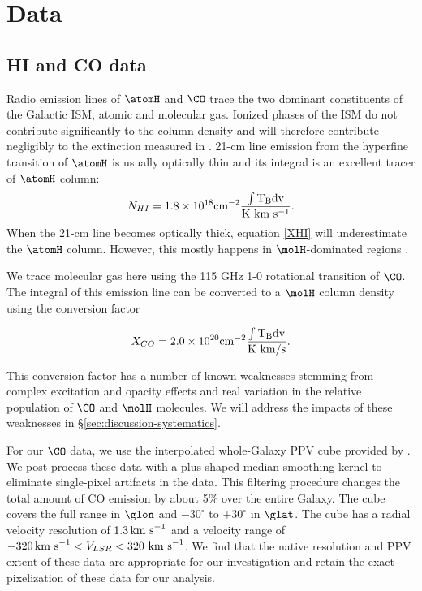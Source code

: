 \section{Data}
\label{sec:data}
\subsection{HI and CO data}

Radio emission lines of $\atomH$ and $\CO$ trace the two dominant constituents of the Galactic ISM, atomic and molecular gas. 
Ionized phases of the ISM do not contribute significantly to the column density and will therefore contribute negligibly to the extinction measured in \citet{Green_2015}. 
21-cm line emission from the hyperfine transition of $\atomH$ is usually optically thin and its integral is an excellent tracer of $\atomH$ column:
\begin{equation}\label{XHI}
N_{HI} = 1.8 \times 10^{18} \rm cm^{-2} \frac{ \int T_B dv}{\rm K~km~s^{-1}}.
\end{equation}
When the 21-cm line becomes optically thick, equation \ref{XHI} will underestimate the $\atomH$ column. 
However, this mostly happens in $\molH$-dominated regions \citep{Goldsmith_2007}.

We trace molecular gas here using the 115 GHz 1-0 rotational transition of $\CO$. 
The integral of this emission line can be converted to a $\molH$ column density using the conversion factor \citep{Bolatto_2013}

\begin{equation}\label{XCO}
X_{CO} = 2.0 \times 10^{20} \rm cm^{-2} \frac{ \int T_B dv}{\rm K~km/s}.
\end{equation}

This conversion factor has a number of known weaknesses stemming from complex excitation and opacity effects and real variation in the relative population of $\CO$ and $\molH$ molecules. 
We will address the impacts of these weaknesses in \S \ref{sec:discussion-systematics}. 

For our $\CO$ data, we use the interpolated whole-Galaxy PPV cube provided by \citet{Dame_2001}. 
We post-process these data with a plus-shaped median smoothing kernel to eliminate single-pixel artifacts in the data. 
This filtering procedure changes the total amount of CO emission by about 5\% over the entire Galaxy. 
The cube covers the full range in $\glon$ and $-30^\circ$ to $+30^\circ$ in $\glat$. 
The cube has a radial velocity resolution of $1.3 {\rm \, km~s}^{-1}$ and a velocity range of $-320{\rm \,km~s} ^{-1} < V_{LSR} < 320 \rm{~km~s}^{-1}$. 
We find that the native resolution and PPV extent of these data are appropriate for our investigation and retain the exact pixelization of these data for our analysis. 

